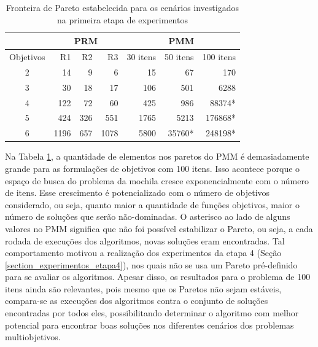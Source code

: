 \begin{table}[!htbp]
	\centering
	\caption{Fronteira de Pareto estabelecida para os cenários investigados na primeira etapa de experimentos}
	\label{table_exp1_paretos}
	\begin{tabular}{c|rrr|rrr}
		& \multicolumn{3}{c|}{\textbf{PRM}} & \multicolumn{3}{c}{\textbf{PMM}} \\ \hline
		Objetivos & R1         & R2       & R3        & 30 itens  & 50 itens & 100 itens \\ \hline
		2         & 14         & 9        & 6         & 15        & 67       & 170       \\
		3         & 30         & 18       & 17        & 106       & 501      & 6288      \\
		4         & 122        & 72       & 60        & 425       & 986      & 88374*    \\
		5         & 424        & 326      & 551       & 1765      & 5213     & 176868*   \\
		6         & 1196       & 657      & 1078      & 5800      & 35760*   & 248198*   \\ \hline
	\end{tabular}
\end{table}

Na Tabela \ref{table_exp1_paretos}, a quantidade de elementos nos paretos do PMM é demasiadamente grande para as formulações de objetivos com 100 itens. Isso acontece porque o espaço de busca do problema da mochila cresce exponencialmente com o número de itens. Esse crescimento é potencializado com o número de objetivos considerado, ou seja, quanto maior a quantidade de funções objetivos, maior o número de soluções que serão não-dominadas. O asterisco ao lado de alguns valores no PMM significa que não foi possível estabilizar o Pareto, ou seja, a cada rodada de execuções dos algoritmos, novas soluções eram encontradas. Tal comportamento motivou a realização dos experimentos da etapa 4 (Seção \ref{section_experimentos_etapa4}), nos quais não se usa um Pareto pré-definido para se avaliar os algoritmos. Apesar disso, os resultados para o problema de 100 itens ainda são relevantes, pois mesmo que os Paretos não sejam estáveis, compara-se as execuções dos algoritmos contra o conjunto de soluções encontradas por todos eles, possibilitando determinar o algoritmo com melhor potencial para encontrar boas soluções nos diferentes cenários dos problemas multiobjetivos.

